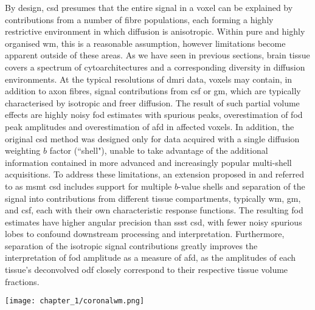 By design, \gls{csd} presumes that the entire signal in a voxel can be explained by contributions from a number of fibre populations, each forming a highly restrictive environment in which diffusion is anisotropic.
Within pure and highly organised \gls{wm}, this is a reasonable assumption, however limitations become apparent outside of these areas.
As we have seen in previous sections, brain tissue covers a spectrum of cytoarchitectures and a corresponding diversity in diffusion environments.
At the typical resolutions of \gls{dmri} data, voxels may contain, in addition to axon fibres, signal contributions from \gls{csf} or \gls{gm}, which are typically characterised by isotropic and freer diffusion.
The result of such partial volume effects are highly noisy \gls{fod} estimates with spurious peaks, overestimation of \gls{fod} peak amplitudes and overestimation of \gls{afd} in affected voxels.\autocite{Jeurissen2014}
In addition, the original \gls{csd} method was designed only for data acquired with a single diffusion weighting $b$ factor (``shell"), unable to take advantage of the additional information contained in more advanced and increasingly popular multi-shell acquisitions.
To address these limitations, an extension proposed in \textcite{Jeurissen2014} and referred to as \gls{msmt} \gls{csd} includes support for multiple $b$-value shells and separation of the signal into contributions from different tissue compartments, typically \gls{wm}, \gls{gm}, and \gls{csf}, each with their own characteristic response functions.
The resulting \gls{fod} estimates have higher angular precision than \gls{ssst} \gls{csd}, with fewer noisy spurious lobes to confound downstream processing and interpretation.
Furthermore, separation of the isotropic signal contributions greatly improves the interpretation of \gls{fod} amplitude as a measure of \gls{afd}, as the amplitudes of each tissue's deconvolved \gls{odf} closely correspond to their respective tissue volume fractions\autocite{Jeurissen2014}.

\begin{SCfigure}
  \texttt{[image: chapter\_1/coronalwm.png]}
  \caption{Coronal section of the author's white matter, imaged with \gls{csd} \gls{dec} mapping and streamline tractography. The \glspl{cst} are visible radiating from the cortex to converge in the internal capsules before descending through the anterior pons, perpendicular to the middle cerebellar peduncle fibres. Either side of the pons, the trigeminal nerves (cranial nerve V) are visible.}
  \label{fig:corwm}
\end{SCfigure}


